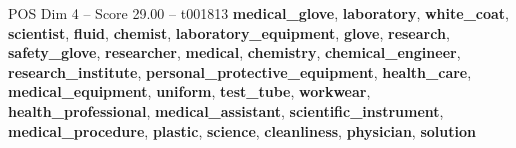 \begin{textsample}{POS Dim 4 – Score 29.00 – t001813}  \label{ex:f4_pos_013}
\textbf{medical\_glove}, \textbf{laboratory}, \textbf{white\_coat}, \textbf{scientist}, \textbf{fluid}, \textbf{chemist}, \textbf{laboratory\_equipment}, \textbf{glove}, \textbf{research}, \textbf{safety\_glove}, \textbf{researcher}, \textbf{medical}, \textbf{chemistry}, \textbf{chemical\_engineer}, \textbf{research\_institute}, \textbf{personal\_protective\_equipment}, \textbf{health\_care}, \textbf{medical\_equipment}, \textbf{uniform}, \textbf{test\_tube}, \textbf{workwear}, \textbf{health\_professional}, \textbf{medical\_assistant}, \textbf{scientific\_instrument}, \textbf{medical\_procedure}, \textbf{plastic}, \textbf{science}, \textbf{cleanliness}, \textbf{physician}, \textbf{solution}

\end{textsample}
